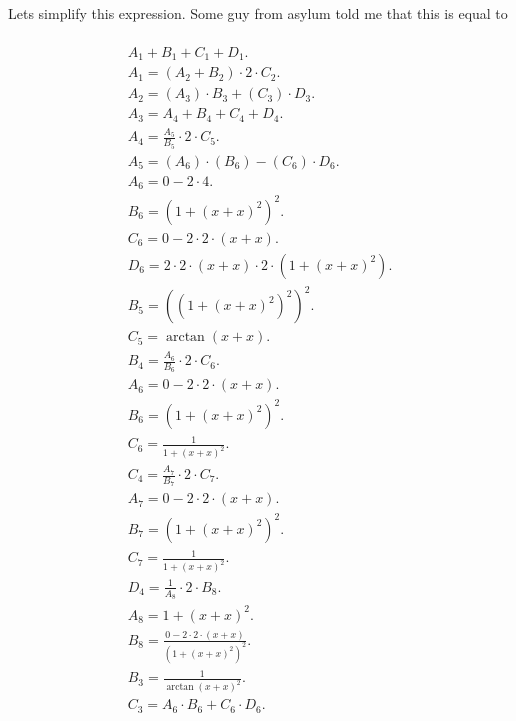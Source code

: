 \documentclass[12pt,a4paper]{extreport}
\begin{document}
Lets simplify this expression.
Some guy from asylum \cite{Anton} told me that this is equal to 

\begin{multline}
\\
A_{1} + B_{1} + C_{1} + D_{1}.\\
A_{1} = (A_{2} + B_{2}) \cdot 2 \cdot C_{2}.\\
A_{2} = (A_{3}) \cdot B_{3} + (C_{3}) \cdot D_{3}.\\
A_{3} = A_{4} + B_{4} + C_{4} + D_{4}.\\
A_{4} = \frac{A_{5}}{B_{5}} \cdot 2 \cdot C_{5}.\\
A_{5} = (A_{6}) \cdot (B_{6}) - (C_{6}) \cdot D_{6}.\\
A_{6} = 0 - 2 \cdot 4.\\
B_{6} = (1 + (x + x) ^ {2}) ^ {2}.\\
C_{6} = 0 - 2 \cdot 2 \cdot (x + x).\\
D_{6} = 2 \cdot 2 \cdot (x + x) \cdot 2 \cdot (1 + (x + x) ^ {2}).\\
B_{5} = ((1 + (x + x) ^ {2}) ^ {2}) ^ {2}.\\
C_{5} = \arctan(x + x).\\
B_{4} = \frac{A_{6}}{B_{6}} \cdot 2 \cdot C_{6}.\\
A_{6} = 0 - 2 \cdot 2 \cdot (x + x).\\
B_{6} = (1 + (x + x) ^ {2}) ^ {2}.\\
C_{6} = \frac{1}{1 + (x + x) ^ {2}}.\\
C_{4} = \frac{A_{7}}{B_{7}} \cdot 2 \cdot C_{7}.\\
A_{7} = 0 - 2 \cdot 2 \cdot (x + x).\\
B_{7} = (1 + (x + x) ^ {2}) ^ {2}.\\
C_{7} = \frac{1}{1 + (x + x) ^ {2}}.\\
D_{4} = \frac{1}{A_{8}} \cdot 2 \cdot B_{8}.\\
A_{8} = 1 + (x + x) ^ {2}.\\
B_{8} = \frac{0 - 2 \cdot 2 \cdot (x + x)}{(1 + (x + x) ^ {2}) ^ {2}}.\\
B_{3} = \frac{1}{\arctan(x + x) ^ {2}}.\\
C_{3} = A_{6} \cdot B_{6} + C_{6} \cdot D_{6}.\\
\end{multline}
\end{document}
